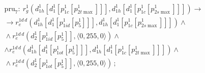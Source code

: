 \begin{itemize}
\begin{multline*}
\end{multline*}





\vspace*{-12pt}





\noindent


\begin{multline*}


\mathrm{pru}_7:\ r_g^1\left( d^1_{1h}\left[ d_1^1\left[ p^1_{1c}\left[ p^1_{2t\max} 


\right]\right]\right], d^1_{1h}\left[ d_1^1\left[ p^1_{1c}\left[ 


p^1_{2s\max}\right]\right]\right]\right)\to{}\\[1pt]


{}\to r_e^{1d\,d}\left( d^1_{1h}\left[ d_1^1\left[ p^1_{1id}\left[ 


p_5^1\right]\right]\right], d^1_{1h}\left[ d_1^1\left[ p^1_{1c} \left[ p^1_{2s\max} 


\right]\right]\right]\right)\wedge{}\\[1pt]


{}\wedge


r_e^{1d\,d} \left( d_2^1\left[ p^1_{1id}\left[ p_5^1\right]\right], \langle 0, 255, 


0\rangle\right)\wedge\\[1pt]


\wedge r_e^{1d\,d}\left( d^1_{1h}\left[ d_1^1 \left[ p^1_{1ot}\left[ 


p_5^1\right]\right]\right], d^1_{1h}\left[ d_1^1\left[ p^1_{1c}\left[ 


p^1_{2t\max}\right]\right]\right]\right) \wedge{}\\[1pt]


{}\wedge


r_e^{1d\,d}\left( d_2^1\left[ p^1_{1ot}\left[ p_5^1\right]\right], \langle 0, 255, 


0\rangle\right)\,;


\end{multline*}





\vspace*{-12pt}





\noindent


\begin{multline*}



\end{multline*}
\end{itemize}
